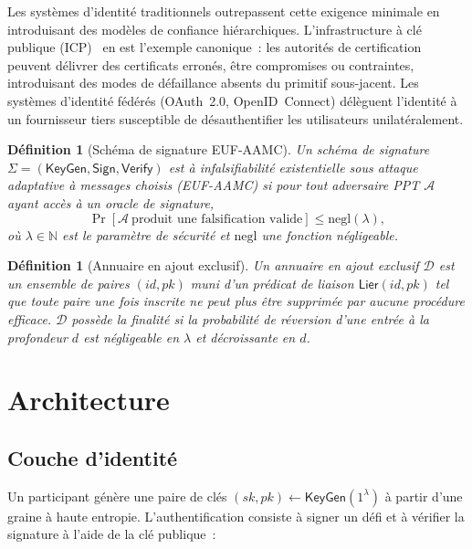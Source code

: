 \documentclass[11pt,a4paper]{article}
\newtheorem{definition}[theoreme]{Définition}
\begin{document}
Les systèmes d'identité traditionnels outrepassent cette exigence minimale en
introduisant des modèles de confiance hiérarchiques.  L'infrastructure à clé
publique (ICP)~\cite{rfc5280} en est l'exemple canonique~: les autorités de
certification peuvent délivrer des certificats erronés, être compromises ou
contraintes, introduisant des modes de défaillance absents du primitif
sous-jacent.  Les systèmes d'identité fédérés (OAuth~2.0, OpenID~Connect)
délèguent l'identité à un fournisseur tiers susceptible de désauthentifier
les utilisateurs unilatéralement.

\begin{definition}[Schéma de signature EUF-AAMC]
  \label{def:sig}
  Un \emph{schéma de signature} $\Sigma = (\mathsf{KeyGen}, \mathsf{Sign},
  \mathsf{Verify})$ est à \emph{infalsifiabilité existentielle sous attaque
  adaptative à messages choisis} (EUF-AAMC) si pour tout adversaire PPT
  $\mathcal{A}$ ayant accès à un oracle de signature,
  \[
    \Pr[\mathcal{A}\ \text{produit une falsification valide}]
    \leq \mathrm{negl}(\lambda),
  \]
  où $\lambda \in \mathbb{N}$ est le paramètre de sécurité et $\mathrm{negl}$
  une fonction négligeable.
\end{definition}

\begin{definition}[Annuaire en ajout exclusif]
  \label{def:dir}
  Un \emph{annuaire en ajout exclusif} $\mathcal{D}$ est un ensemble de
  paires $(id, pk)$ muni d'un prédicat de liaison $\mathsf{Lier}(id, pk)$
  tel que toute paire une fois inscrite ne peut plus être supprimée par
  aucune procédure efficace.  $\mathcal{D}$ possède la \emph{finalité} si
  la probabilité de réversion d'une entrée à la profondeur $d$ est négligeable
  en $\lambda$ et décroissante en $d$.
\end{definition}

\section{Architecture}

\subsection{Couche d'identité}

Un participant génère une paire de clés
$(sk, pk) \gets \mathsf{KeyGen}(1^\lambda)$ à partir d'une graine à haute
entropie.  L'authentification consiste à signer un défi et à vérifier la
signature à l'aide de la clé publique~:
\end{document}
